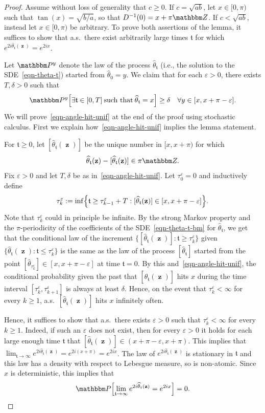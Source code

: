 \documentclass[11pt]{article}
\theoremstyle{plain}
\theoremstyle{definition}
\numberwithin{equation}{section}
\newcommand{\eqb}{\begin{equation}}
\newcommand{\eqe}{\end{equation}}
\newcommand{\eqbn}{\begin{equation*}}
\newcommand{\eqen}{\end{equation*}}
\newcommand{\BB}{\mathbbm}
\newcommand{\op}{\operatorname}
\newcommand{\ep}{\varepsilon}
\newcommand{\wh}{\widehat}
\newcommand{\zz}{{\op{\mathbf{z}}}}
\newcommand{\tz}{{\mathfrak t}}
\let\originalleft\left
\let\originalright\right
\renewcommand{\left}{\mathopen{}\mathclose\bgroup\originalleft}
\renewcommand{\right}{\aftergroup\egroup\originalright}
\begin{document}
\begin{proof}%
Assume without loss of generality that $c\geq 0$. If $c = \sqrt{a b}$, let $x  \in [0,\pi)$ such that $\tan(x) = \sqrt{b/a}$, so that $D^{-1}(0) = x + \pi \BB Z$. If $c < \sqrt{ab}$, instead let $x \in [0,\pi)$ be arbitrary. To prove both assertions of the lemma, it suffices to show that a.s.\ there exist arbitrarily large times $\tz$ for which $e^{2 i \wh\theta_{\tz}(\zz)} = e^{2 i x}$. 
  
Let $\BB P^y$ denote the law of the process $\wh\theta_{\tz}$ (i.e., the solution to the SDE~\eqref{eqn-theta-t}) started from $\wh\theta_0 = y$. We claim that for each $\ep  >0$, there exists $T , \delta>0$ such that 
\eqb \label{eqn-angle-hit-unif}
\BB P^y\left[  \exists \tz \in [0,T] \: \text{such that} \: \wh\theta_{\tz} = x \right]  \geq \delta \quad\forall y \in [x,x+\pi-\ep] .
\eqe  
We will prove~\eqref{eqn-angle-hit-unif} at the end of the proof using stochastic calculus. First we explain how~\eqref{eqn-angle-hit-unif} implies the lemma statement.

For $\tz \geq 0$, let $[\wh\theta_{\tz}(\zz)]$ be the unique number in $[x,x+\pi)$ for which
\eqbn
\wh\theta_{\tz}(\zz)  - [\wh\theta_{\tz}(\zz)] \in \pi \BB Z. 
\eqen
Fix $\ep > 0$ and let $T,\delta$ be as in~\eqref{eqn-angle-hit-unif}. Let $\tau_0^\ep = 0$ and inductively define 
\eqbn
\tau_k^\ep := \inf\left\{ \tz \geq \tau_{k-1}^\ep + T : [\wh\theta_{\tz}(\zz) ] \in [x,x+\pi-\ep] \right\}  .
\eqen
Note that $\tau_k^\ep$ could in principle be infinite. 
By the strong Markov property and the $\pi$-periodicity of the coefficients of the SDE~\eqref{eqn-theta-t-bm} for $\wh\theta_{\tz}$, we get that the conditional law of the increment $\{[\wh\theta_{\tz}(\zz)] : \tz \geq \tau_k^\ep \}$ given $\{ \wh\theta_{\tz}(\zz)  : \tz \leq \tau_k^\ep\}$ is the same as the law of the process $[\wh\theta_{\tz}]$ started from the point $[\wh\theta_{\tau_k^\ep}] \in [x,x+\pi-\ep]$ at time $\tz=0$. 
By this and~\eqref{eqn-angle-hit-unif}, the conditional probability given the past that $[\wh\theta_{\tz}(\zz)]$ hits $x$ during the time interval $[\tau_k^\ep,\tau_{k+1}^\ep]$ is always at least $\delta$. Hence, on the event that $\tau_k^\ep < \infty$ for every $k\geq 1$, a.s.\ $[\wh\theta_{\tz}(\zz)]$ hits $x$ infinitely often. 

Hence, it suffices to show that a.s.\ there exists $\ep > 0$ such that $\tau_k^\ep < \infty$ for every $k\geq 1$. 
Indeed, if such an $\ep$ does not exist, then for every $\ep > 0$ it holds for each large enough time $\tz$ that $[\wh\theta_{\tz}(\zz) ] \in (x+\pi-\ep,x+\pi)$. This implies that $\lim_{\tz\to\infty} e^{2i\wh\theta_{\tz}(\zz)} = e^{2i (x+\pi)} = e^{2i x}$.  
The law of $e^{2 i \wh\theta_{\tz}(\zz)}$ is stationary in $\tz$ and this law has a density with respect to Lebesgue measure, so is non-atomic. Since $x$ is deterministic, this implies that
\eqbn
\BB P\left[\lim_{\tz\to\infty} e^{2 i \wh\theta_{\tz}(\zz) } = e^{2 i x } \right]  = 0 .
\eqen


\end{proof}
\end{document}
